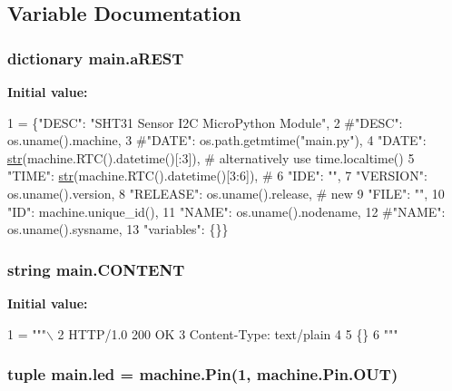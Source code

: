 \subsection{Variable Documentation}
\hypertarget{namespacemain_ae45e77e713b3c943659056426e077b4c}{
\subsubsection[{a\-R\-E\-S\-T}]{\setlength{\rightskip}{0pt plus 5cm}dictionary main.\-a\-R\-E\-S\-T}}\label{namespacemain_ae45e77e713b3c943659056426e077b4c}
{\bfseries Initial value\-:}
\begin{DoxyCode}
1 = \{\textcolor{stringliteral}{"DESC"}: \textcolor{stringliteral}{"SHT31 Sensor I2C MicroPython Module"},
2          \textcolor{comment}{#"DESC": os.uname().machine,}
3          \textcolor{comment}{#"DATE": os.path.getmtime("main.py"),}
4          \textcolor{stringliteral}{"DATE"}: \hyperlink{General__Stuff_8h_ad8ab729381f270b100f3d05b6c6676fc}{str}(machine.RTC().datetime()[:3]),   \textcolor{comment}{# alternatively use time.localtime()}
5          \textcolor{stringliteral}{"TIME"}: \hyperlink{General__Stuff_8h_ad8ab729381f270b100f3d05b6c6676fc}{str}(machine.RTC().datetime()[3:6]),  \textcolor{comment}{#}
6          \textcolor{stringliteral}{"IDE"}: \textcolor{stringliteral}{""},
7          \textcolor{stringliteral}{"VERSION"}: os.uname().version,
8          \textcolor{stringliteral}{"RELEASE"}: os.uname().release,               \textcolor{comment}{# new}
9          \textcolor{stringliteral}{"FILE"}: \textcolor{stringliteral}{""},
10          \textcolor{stringliteral}{"ID"}: machine.unique\_id(),
11          \textcolor{stringliteral}{"NAME"}: os.uname().nodename,
12          \textcolor{comment}{#"NAME": os.uname().sysname,}
13          \textcolor{stringliteral}{"variables"}: \{\}\}
\end{DoxyCode}
\hypertarget{namespacemain_a9f1b66682ed213ee4114be73ecccc969}{
\subsubsection[{C\-O\-N\-T\-E\-N\-T}]{\setlength{\rightskip}{0pt plus 5cm}string main.\-C\-O\-N\-T\-E\-N\-T}}\label{namespacemain_a9f1b66682ed213ee4114be73ecccc969}
{\bfseries Initial value\-:}
\begin{DoxyCode}
1 = \textcolor{stringliteral}{"""\(\backslash\)}
2 \textcolor{stringliteral}{HTTP/1.0 200 OK}
3 \textcolor{stringliteral}{Content-Type: text/plain}
4 \textcolor{stringliteral}{}
5 \textcolor{stringliteral}{\{\}}
6 \textcolor{stringliteral}{"""}
\end{DoxyCode}
\hypertarget{namespacemain_afa42c8222ef34c64505913e2c20ca278}{
\subsubsection[{led}]{\setlength{\rightskip}{0pt plus 5cm}tuple main.\-led = machine.\-Pin(1, machine.\-Pin.\-O\-U\-T)}}\label{namespacemain_afa42c8222ef34c64505913e2c20ca278}
